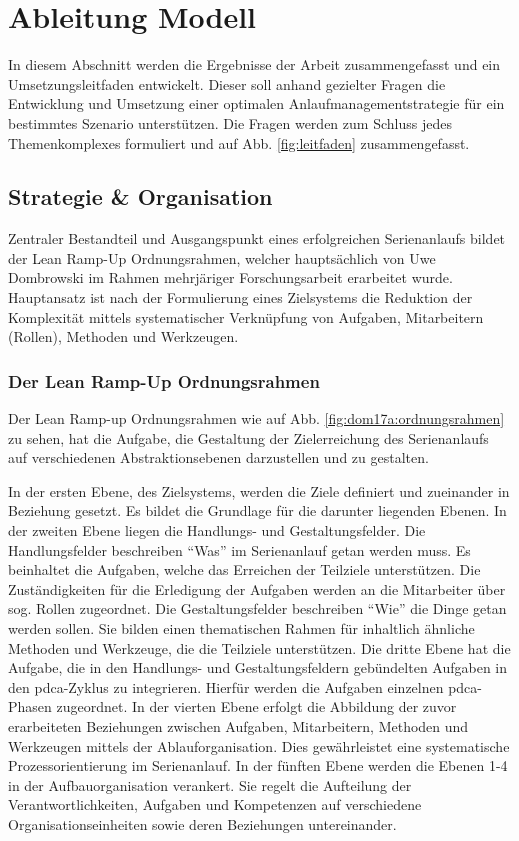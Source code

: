 \chapter{Ableitung Modell}\label{sec:ableitung}
In diesem Abschnitt werden die Ergebnisse der Arbeit zusammengefasst und ein Umsetzungsleitfaden entwickelt. %
Dieser soll anhand gezielter Fragen die Entwicklung und Umsetzung einer optimalen Anlaufmanagementstrategie für ein bestimmtes Szenario unterstützen. 
Die Fragen werden zum Schluss jedes Themenkomplexes formuliert und auf Abb. \ref{fig:leitfaden} %
zusammengefasst. 

\section{Strategie \& Organisation}

Zentraler Bestandteil und Ausgangspunkt eines erfolgreichen Serienanlaufs bildet der Lean Ramp-Up Ordnungsrahmen, welcher hauptsächlich von Uwe Dombrowski im Rahmen mehrjäriger Forschungsarbeit erarbeitet wurde. Hauptansatz ist nach der Formulierung eines Zielsystems die Reduktion der Komplexität mittels systematischer Verknüpfung von Aufgaben, Mitarbeitern (Rollen), Methoden und Werkzeugen. 

\subsection*{Der Lean Ramp-Up Ordnungsrahmen}
 Der Lean Ramp-up Ordnungsrahmen wie auf Abb. \ref{fig:dom17a:ordnungsrahmen} zu sehen, hat die Aufgabe, die Gestaltung der Zielerreichung des Serienanlaufs auf verschiedenen Abstraktionsebenen darzustellen und zu gestalten. 
 
In der ersten Ebene, des Zielsystems, werden die Ziele definiert und zueinander in Beziehung gesetzt. Es bildet die Grundlage für die darunter liegenden Ebenen. 
% 
In der zweiten Ebene liegen die Handlungs- und Gestaltungsfelder. Die Handlungsfelder beschreiben ``Was'' im Serienanlauf getan werden muss. 
Es beinhaltet die Aufgaben, welche das Erreichen der Teilziele unterstützen. Die Zuständigkeiten für die Erledigung der Aufgaben werden an die Mitarbeiter über sog. Rollen zugeordnet.
Die Gestaltungsfelder beschreiben ``Wie'' die Dinge getan werden sollen. Sie bilden einen thematischen Rahmen für inhaltlich ähnliche Methoden und Werkzeuge, die die Teilziele unterstützen.
% 
Die dritte Ebene hat die Aufgabe, die in den Handlungs- und Gestaltungsfeldern gebündelten Aufgaben in den \gls{pdca}-Zyklus zu integrieren. Hierfür werden die Aufgaben einzelnen \gls{pdca}-Phasen zugeordnet. 
% 
In der vierten Ebene erfolgt die Abbildung der zuvor erarbeiteten Beziehungen zwischen Aufgaben, Mitarbeitern, Methoden und Werkzeugen mittels der Ablauforganisation.  Dies gewährleistet eine systematische Prozessorientierung im Serienanlauf. 
% 
In der fünften Ebene werden die Ebenen 1-4 in der Aufbauorganisation verankert. Sie regelt die Aufteilung der Verantwortlichkeiten, Aufgaben und Kompetenzen auf verschiedene Organisationseinheiten sowie deren Beziehungen untereinander. 

